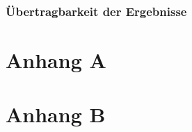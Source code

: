\documentclass[oneside]{ausarbeitung}
\begin{document}
\subsection{Übertragbarkeit der Ergebnisse}
\label{sub:uebertragbarkeit}

\appendix

\printbibliography

\chapter{Anhang A}

\chapter{Anhang B}
\end{document}
